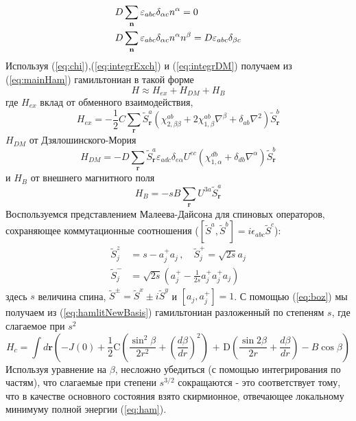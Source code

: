 \documentclass[a4paper,article,14pt]{extarticle}
\begin{document}
\begin{eqnarray}
\label{eq:integrDM}
\begin{gathered}
  D\sum\limits_{\mathbf{n}} {{\varepsilon _{abc}}{\delta _{\alpha c}}{n^\alpha }}  = 0 \hfill \\
  D\sum\limits_{\mathbf{n}} {{\varepsilon _{abc}}{\delta _{\alpha c}}{n^\alpha }{n^\beta }}  = D{\varepsilon _{abc}}{\delta _{\beta c}} \hfill \\ 
\end{gathered}
\end{eqnarray}
Используя (\ref{eq:chi}),(\ref{eq:integrExch}) и (\ref{eq:integrDM}) получаем из (\ref{eq:mainHam}) гамильтониан в такой форме
\begin{equation}
\label{eq:hamlitNewBasis}
H \approx {H_{ex}} + {H_{DM}} + {H_B}
\end{equation}
где $H_{ex}$ вклад от обменного взаимодействия,
\[{H_{ex}} =  - \frac{1}{2}C\sum\limits_{\mathbf{r}} {\tilde S_{\mathbf{r}}^a\left( {\chi _{2,\beta \beta }^{ab} + 2\chi _{1,\beta }^{ab}{\nabla ^\beta } + {\delta _{ab}} \nabla ^ 2 } \right)\tilde S_{\mathbf{r}}^b} \]
$H_{DM}$ от Дзялошинского-Мория
\[{H_{DM}} =  - D\sum\limits_{\mathbf{r}} {\tilde S_{\mathbf{r}}^a{\varepsilon _{adc}}{\delta _{e\alpha }}{U^{ec}}\left( {\chi _{1,\alpha }^{db} + {\delta _{db}}{\nabla ^\alpha }} \right)\tilde S_{\mathbf{r}}^b} \]
и $H_B$ от внешнего магнитного поля 
\[{H_B} =  - sB\sum\limits_{\mathbf{r}} {{U^{3a}}\tilde S_{\mathbf{r}}^a} \]
Воспользуемся представлением Малеева-Дайсона для спиновых операторов, сохраняющее коммутационные соотношения  ($[\tilde{S}^a,\tilde{S}^b] = i \epsilon_{abc}\tilde{S}^c$):
\begin{equation} 
\begin{aligned} 
\label{eq:boz}
     \tilde{S}^{z}_{j} &=s-a^+_{ j} a_{ j} \,, \quad   
       \tilde{S}^{+}_{j}=\sqrt{2s}a_{ j}  \\
     \tilde{S}^{-}_{j} &=\sqrt{2s}\left( a^{+}_{ j} - \frac{1}{2s}a^+_{ j}a^{+}_{ j}a_{ j} \right)
  \end{aligned}  
 \end{equation} 
здесь $s$ величина спина,  $\tilde S^{\pm} = \tilde S^{x} \pm i \tilde S^{y}$ и $[a_{ j},a^+_{ j}] = 1$.  
С помощью (\ref{eq:boz}) мы получаем из (\ref{eq:hamlitNewBasis}) гамильтониан разложенный по степеням $s$, где слагаемое при $s^2$
\[{H_c} = \int {d\mathbf{r} \left( {-J\left( 0 \right) + \frac{1}{2}{\text{C}}\left( {\frac{{{{\sin }^2}\beta }}{{2{r^2}}} + {{\left( {\frac{{d\beta }}{{dr}}} \right)}^2}} \right){\text{ + D}}\left( {\frac{{\sin 2\beta }}{{2r}} + \frac{{d\beta }}{{dr}}} \right) - B\cos \beta } \right)} \]
Используя уравнение на $\beta$, несложно убедиться (с помощью интегрирования по частям), что слагаемые при степени $s^{3/2}$ сокращаются - это соответствует тому, что в качестве основного состояния взято скирмионное, отвечающее локальному минимуму полной энергии (\ref{eq:ham}). 
\end{document}
